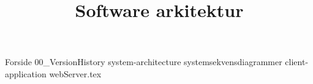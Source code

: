 \documentclass[a4paper,openany]{memoir}
\title{Software arkitektur}
\begin{document}
	{Forside}  \newpage
	\tableofcontents\thispagestyle{fancy}
	{00_VersionHistory}  \newpage
	{system-architecture}  \newpage
	{systemsekvensdiagrammer}  \newpage
	{client-application}  \newpage
	{webServer.tex} \newpage

	
	 {}
	\printbibliography
\end{document}
